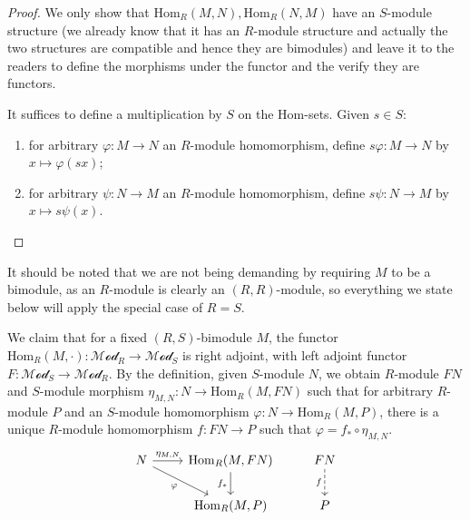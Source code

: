 \documentclass{note-eng}
\begin{document}
\begin{proof}
    We only show that $\mathrm{Hom}_{R}(M, N), \mathrm{Hom}_{R}(N, M)$ have an $S$-module structure (we already know that it has an $R$-module structure and actually the two structures are compatible and hence they are bimodules) and leave it to the readers to define the morphisms under the functor and the verify they are functors.

    It suffices to define a multiplication by $S$ on the $\mathrm{Hom}$-sets. Given $s \in S$:
    \begin{enumerate}
        \item for arbitrary $\varphi: M \rightarrow N$ an $R$-module homomorphism, define $s \varphi: M \rightarrow N$ by $x \mapsto \varphi(sx)$;
        \item for arbitrary $\psi: N \rightarrow M$ an $R$-module homomorphism, define $s \psi: N \rightarrow M$ by $x \mapsto s \psi(x)$.
    \end{enumerate}
\end{proof}

It should be noted that we are not being demanding by requiring $M$ to be a bimodule, as an $R$-module is clearly an $(R, R)$-module, so everything we state below will apply the special case of $R = S$.

We claim that for a fixed $(R, S)$-bimodule $M$, the functor $\mathrm{Hom}_{R}(M, \cdot): \mathscr{Mod}_R \rightarrow \mathscr{Mod}_S$ is right adjoint, with left adjoint functor $F: \mathscr{Mod}_S \rightarrow \mathscr{Mod}_R$. By the definition, given $S$-module $N$, we obtain $R$-module $FN$ and $S$-module morphism $\eta_{M, N}: N \rightarrow \mathrm{Hom}_{R}(M, FN)$ such that for arbitrary $R$-module $P$ and an $S$-module homomorphism $\varphi: N \rightarrow \mathrm{Hom}_{R}(M, P)$, there is a unique $R$-module homomorphism $f: FN \rightarrow P$ such that $\varphi = f_\ast \circ \eta_{M, N}$.
\[\begin{tikzcd}
	N & {\mathrm{Hom}_R(M, FN)} & FN \\
	& {\mathrm{Hom}_R(M, P)} & P
	\arrow["{\eta_{M, N}}", from=1-1, to=1-2]
	\arrow["\varphi"', from=1-1, to=2-2]
	\arrow["{f_\ast}"', from=1-2, to=2-2]
	\arrow["f"', dashed, from=1-3, to=2-3]
\end{tikzcd}\]
\end{document}
